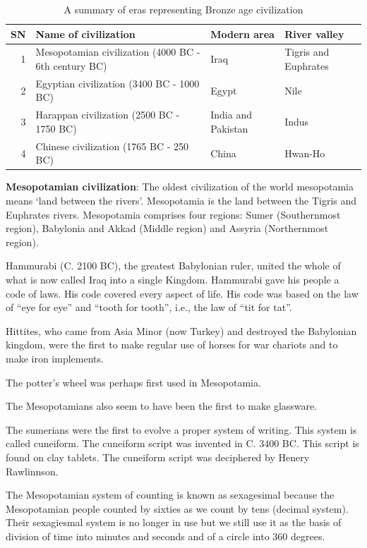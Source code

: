 \documentclass[
  openany]{book}
\begin{document}
\begin{table}

\caption{\label{tab:bronze-age}A summary of eras representing Bronze age civilization}
\centering
\begin{tabular}[t]{rlll}
\toprule
SN & Name of civilization & Modern area & River valley\\
\midrule
1 & Mesopotamian civilization (4000 BC - 6th century BC) & Iraq & Tigris and Euphrates\\
2 & Egyptian civilization (3400 BC - 1000 BC) & Egypt & Nile\\
3 & Harappan civilization (2500 BC - 1750 BC) & India and Pakistan & Indus\\
4 & Chinese civilization (1765 BC - 250 BC) & China & Hwan-Ho\\
\bottomrule
\end{tabular}
\end{table}

\textbf{Mesopotamian civilization}: The oldest civilization of the world mesopotamia means `land between the rivers'. Mesopotamia is the land between the Tigris and Euphrates rivers. Mesopotamia comprises four regions: Sumer (Southernmost region), Babylonia and Akkad (Middle region) and Assyria (Northernmost region).

Hammurabi (C. 2100 BC), the greatest Babylonian ruler, united the whole of what is now called Iraq into a single Kingdom. Hammurabi gave his people a code of laws. His code covered every aspect of life. His code was based on the law of ``eye for eye'' and ``tooth for tooth'', i.e., the law of ``tit for tat''.

Hittites, who came from Asia Minor (now Turkey) and destroyed the Babylonian kingdom, were the first to make regular use of horses for war chariots and to make iron implements.

The potter's wheel was perhaps first used in Mesopotamia.

The Mesopotamians also seem to have been the first to make glassware.

The sumerians were the first to evolve a proper system of writing. This system is called cuneiform. The cuneiform script was invented in C. 3400 BC. This script is found on clay tablets. The cuneiform script was deciphered by Henery Rawlinnson.

The Mesopotamian system of counting is known as sexagesimal because the Mesopotamian people counted by sixties as we count by tens (decimal system). Their sexagiesmal system is no longer in use but we still use it as the basis of division of time into minutes and seconds and of a circle into 360 degrees.
\end{document}
